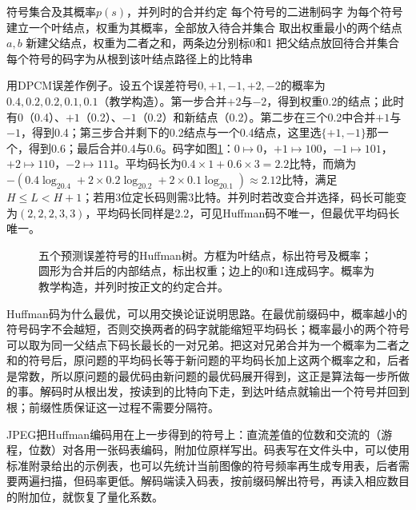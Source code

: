\begin{algorithm}[Huffman编码的构造]
 \label{alg:vision-huffman}
 \begin{algorithmic}[1]
  \Require 符号集合及其概率$p(s)$，并列时的合并约定
  \Ensure 每个符号的二进制码字
  \State 为每个符号建立一个叶结点，权重为其概率，全部放入待合并集合
   \State 取出权重最小的两个结点$a,b$
   \State 新建父结点，权重为二者之和，两条边分别标0和1
   \State 把父结点放回待合并集合
  \EndWhile
  \State 每个符号的码字为从根到该叶结点路径上的比特串
 \end{algorithmic}
\end{algorithm}

用DPCM误差作例子。设五个误差符号$0,+1,-1,+2,-2$的概率为$0.4,0.2,0.2,0.1,0.1$（教学构造）。第一步合并$+2$与$-2$，得到权重0.2的结点；此时有$0$（0.4）、$+1$（0.2）、$-1$（0.2）和新结点（0.2）。第二步在三个0.2中合并$+1$与$-1$，得到0.4；第三步合并剩下的0.2结点与一个0.4结点，这里选$\{+1,-1\}$那一个，得到0.6；最后合并0.4与0.6。码字如图\ref{fig:vision-huffman-tree}：$0\mapsto0$，$+1\mapsto100$，$-1\mapsto101$，$+2\mapsto110$，$-2\mapsto111$。平均码长为$0.4\times1+0.6\times3=2.2$比特，而熵为$-(0.4\log_20.4+2\times0.2\log_20.2+2\times0.1\log_20.1)\approx2.12$比特，满足$H\leq L<H+1$；若用3位定长码则需3比特。并列时若改变合并选择，码长可能变为$(2,2,2,3,3)$，平均码长同样是2.2，可见Huffman码不唯一，但最优平均码长唯一。

\begin{figure}[htbp]
 \centering
 
 \caption{五个预测误差符号的Huffman树。方框为叶结点，标出符号及概率；圆形为合并后的内部结点，标出权重；边上的0和1连成码字。概率为教学构造，并列时按正文的约定合并。}
 \label{fig:vision-huffman-tree}
\end{figure}

Huffman码为什么最优，可以用交换论证说明思路。在最优前缀码中，概率越小的符号码字不会越短，否则交换两者的码字就能缩短平均码长；概率最小的两个符号可以取为同一父结点下码长最长的一对兄弟。把这对兄弟合并为一个概率为二者之和的符号后，原问题的平均码长等于新问题的平均码长加上这两个概率之和，后者是常数，所以原问题的最优码由新问题的最优码展开得到，这正是算法每一步所做的事。解码时从根出发，按读到的比特向下走，到达叶结点就输出一个符号并回到根；前缀性质保证这一过程不需要分隔符。

JPEG把Huffman编码用在上一步得到的符号上：直流差值的位数和交流的（游程，位数）对各用一张码表编码，附加位原样写出。码表写在文件头中，可以使用标准附录给出的示例表，也可以先统计当前图像的符号频率再生成专用表，后者需要两遍扫描，但码率更低。解码端读入码表，按前缀码解出符号，再读入相应数目的附加位，就恢复了量化系数。


